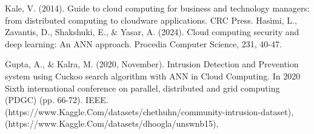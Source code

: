 \documentclass{llncs}
\begin{document}
%
%
%
% 
% 
%
\begin{thebibliography}{8}
Kale, V. (2014). Guide to cloud computing for business and technology managers: from distributed computing to cloudware applications. CRC Press.
Hasimi, L., Zavantis, D., Shakshuki, E., & Yasar, A. (2024). Cloud computing security and deep learning: An ANN approach. Procedia Computer Science, 231, 40-47.

Gupta, A., & Kalra, M. (2020, November). Intrusion Detection and Prevention system using Cuckoo search algorithm with ANN in Cloud Computing. In 2020 Sixth international conference on parallel, distributed and grid computing (PDGC) (pp. 66-72). IEEE.
(https://www.Kaggle.Com/datasets/chethuhn/community-intrusion-dataset),(https://www.Kaggle.Com/datasets/dhoogla/unswnb15),
 

\end{thebibliography}
\end{document}
